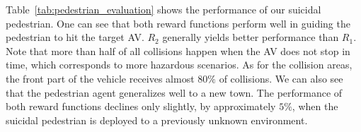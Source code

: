 \documentclass[letterpaper, 10 pt, conference]{ieeeconf}
\newcommand{\Rs}{R_1}
\newcommand{\Rc}{R_2}
\begin{document}
Table~\ref{tab:pedestrian_evaluation} shows the performance of our suicidal pedestrian. One can see that both reward functions perform well in guiding the pedestrian to hit the target AV. $\Rc$ generally yields better performance than $\Rs$.
Note that more than half of all collisions happen when the AV does not stop in time, which corresponds to more hazardous scenarios. %
As for the collision areas, the front part of the vehicle receives almost $80\%$ of collisions. We can also see that the pedestrian agent generalizes well to a new town.
The performance of both reward functions declines only slightly, by approximately $5\%$, when the suicidal pedestrian is deployed to a previously unknown environment.



\end{document}
